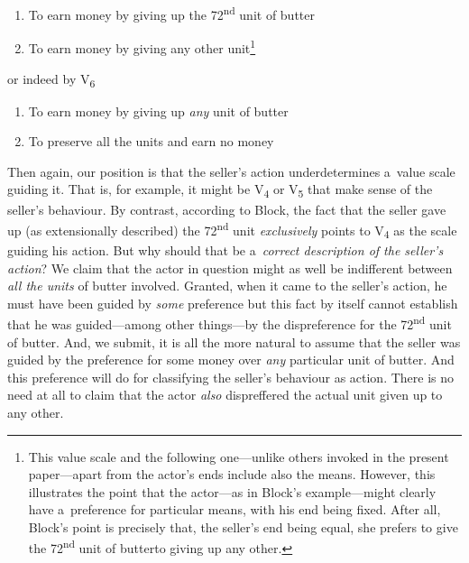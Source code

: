 \begin{enumerate}

\item To earn money by giving up the 72\textsuperscript{nd }unit of butter

\item To earn money by giving any other unit\footnote{This value scale and the following one---unlike others invoked in the present paper---apart from the actor's ends include also the means. However, this illustrates the point that the actor---as in Block's example---might clearly have a~preference for particular means, with his end being fixed. After all, Block's point is precisely that, the seller's end being equal, she prefers to give the 72\textsuperscript{nd }unit of butterto giving up any other. }

\end{enumerate}

or indeed by V\textsubscript{6}



\begin{enumerate}

\item To earn money by giving up \textit{any} unit of butter

\item To preserve all the units and earn no money

\end{enumerate}

Then again, our position is that the seller's action underdetermines a~value scale guiding it. That is, for example, it might be V\textsubscript{4} or V\textsubscript{5} that make sense of the seller's behaviour. By contrast, according to Block, the fact that the seller gave up (as extensionally described) the 72\textsuperscript{nd }unit \textit{exclusively} points to V\textsubscript{4} as the scale guiding his action. But why should that be a~\textit{correct description of the seller's action}? We claim that the actor in question might as well be indifferent between \textit{all the units} of butter involved. Granted, when it came to the seller's action, he must have been guided by \textit{some} preference but this fact by itself cannot establish that he was guided---among other things---by the dispreference for the 72\textsuperscript{nd} unit of butter. And, we submit, it is all the more natural to assume that the seller was guided by the preference for some money over \textit{any} particular unit of butter. And this preference will do for classifying the seller's behaviour as action. There is no need at all to claim that the actor \textit{also} dispreffered the actual unit given up to any other.



